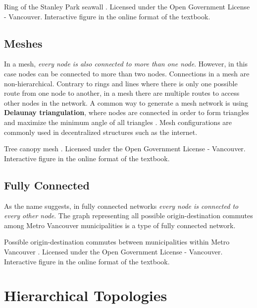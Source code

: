 \documentclass[
]{book}
\begin{document}
\label{fig:8-stanley-park-seawall}Ring of the Stanley Park seawall \citep{city_of_vancouver_open_nodate}. Licensed under the Open Government License - Vancouver. Interactive figure in the online format of the textbook.

\hypertarget{meshes}{%
\subsection{Meshes}\label{meshes}}

In a mesh, \emph{every node is also connected to more than one node}. However, in this case nodes can be connected to more than two nodes. Connections in a mesh are non-hierarchical. Contrary to rings and lines where there is only one possible route from one node to another, in a mesh there are multiple routes to access other nodes in the network. A common way to generate a mesh network is using \textbf{Delaunay triangulation}, where nodes are connected in order to form triangles and maximize the minimum angle of all triangles \citep{wikimedia_delaunay_2021}. Mesh configurations are commonly used in decentralized structures such as the internet.

\label{fig:8-tree-canopy-mesh}Tree canopy mesh \citep{city_of_vancouver_open_nodate}. Licensed under the Open Government License - Vancouver. Interactive figure in the online format of the textbook.

\hypertarget{fully-connected}{%
\subsection{Fully Connected}\label{fully-connected}}

As the name suggests, in fully connected networks \emph{every node is connected to every other node}. The graph representing all possible origin-destination commutes among Metro Vancouver municipalities is a type of fully connected network.

\label{fig:8-origin-destination}Possible origin-destination commutes between municipalities within Metro Vancouver \citep{city_of_vancouver_open_nodate}. Licensed under the Open Government License - Vancouver. Interactive figure in the online format of the textbook.

\hypertarget{hierarchical-topologies}{%
\section{Hierarchical Topologies}\label{hierarchical-topologies}}
\end{document}
